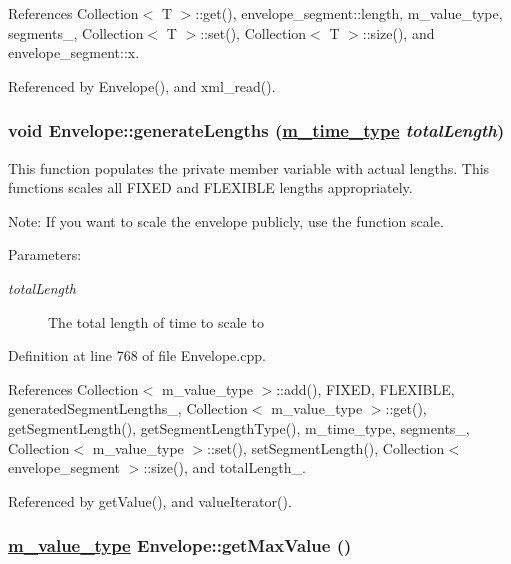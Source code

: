 References Collection$<$ T $>$::get(), envelope\_\-segment::length, m\_\-value\_\-type, segments\_\-, Collection$<$ T $>$::set(), Collection$<$ T $>$::size(), and envelope\_\-segment::x.

Referenced by Envelope(), and xml\_\-read().\hypertarget{classEnvelope_d1}{
\subsubsection[generateLengths]{\setlength{\rightskip}{0pt plus 5cm}void Envelope::generate\-Lengths (\hyperlink{Types_8h_a2}{m\_\-time\_\-type} {\em total\-Length})}}
\label{classEnvelope_d1}


This function populates the private member variable with actual lengths. This functions scales all FIXED and FLEXIBLE lengths appropriately. \begin{Desc}
\item[Note:]If you want to scale the envelope publicly, use the function scale. \end{Desc}
\begin{Desc}
\item[Parameters:]
\begin{description}
\item[{\em total\-Length}]The total length of time to scale to \end{description}
\end{Desc}


Definition at line 768 of file Envelope.cpp.

References Collection$<$ m\_\-value\_\-type $>$::add(), FIXED, FLEXIBLE, generated\-Segment\-Lengths\_\-, Collection$<$ m\_\-value\_\-type $>$::get(), get\-Segment\-Length(), get\-Segment\-Length\-Type(), m\_\-time\_\-type, segments\_\-, Collection$<$ m\_\-value\_\-type $>$::set(), set\-Segment\-Length(), Collection$<$ envelope\_\-segment $>$::size(), and total\-Length\_\-.

Referenced by get\-Value(), and value\-Iterator().\hypertarget{classEnvelope_a28}{
\subsubsection[getMaxValue]{\setlength{\rightskip}{0pt plus 5cm}\hyperlink{Types_8h_a3}{m\_\-value\_\-type} Envelope::get\-Max\-Value ()}}
\label{classEnvelope_a28}


